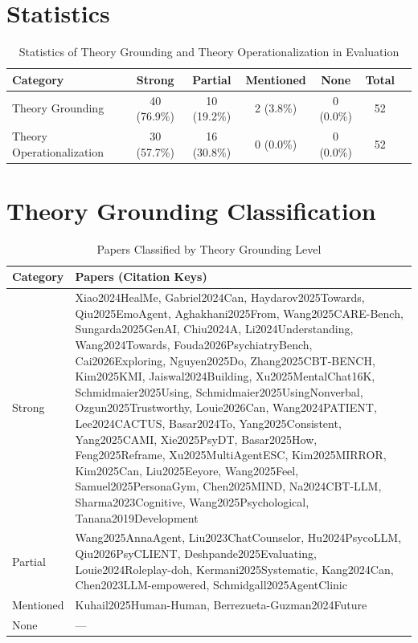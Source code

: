 
\section{Statistics}
\begin{table}[htbp]
\centering
\caption{Statistics of Theory Grounding and Theory Operationalization in Evaluation}
\label{tab:theory-stats}
\begin{tabular}{lcccccc}
\toprule
\textbf{Category} & \textbf{Strong} & \textbf{Partial} & \textbf{Mentioned} & \textbf{None} & \textbf{Total} \\
\midrule
Theory Grounding & 40 (76.9\%) & 10 (19.2\%) & 2 (3.8\%) & 0 (0.0\%) & 52 \\
Theory Operationalization & 30 (57.7\%) & 16 (30.8\%) & 0 (0.0\%) & 0 (0.0\%) & 52 \\
\bottomrule
\end{tabular}
\end{table}


\section{Theory Grounding Classification}
\begin{table}[htbp]
\centering
\caption{Papers Classified by Theory Grounding Level}
\label{tab:theory-grounding}
\small
\begin{tabular}{p{2.5cm}p{12.4cm}}
\toprule
\textbf{Category} & \textbf{Papers (Citation Keys)} \\
\midrule
Strong & Xiao2024HealMe, Gabriel2024Can, Haydarov2025Towards, Qiu2025EmoAgent, Aghakhani2025From, Wang2025CARE-Bench, Sungarda2025GenAI, Chiu2024A, Li2024Understanding, Wang2024Towards, Fouda2026PsychiatryBench, Cai2026Exploring, Nguyen2025Do, Zhang2025CBT-BENCH, Kim2025KMI, Jaiswal2024Building, Xu2025MentalChat16K, Schmidmaier2025Using, Schmidmaier2025UsingNonverbal, Ozgun2025Trustworthy, Louie2026Can, Wang2024PATIENT, Lee2024CACTUS, Basar2024To, Yang2025Consistent, Yang2025CAMI, Xie2025PsyDT, Basar2025How, Feng2025Reframe, Xu2025MultiAgentESC, Kim2025MIRROR, Kim2025Can, Liu2025Eeyore, Wang2025Feel, Samuel2025PersonaGym, Chen2025MIND, Na2024CBT-LLM, Sharma2023Cognitive, Wang2025Psychological, Tanana2019Development \\
Partial & Wang2025AnnaAgent, Liu2023ChatCounselor, Hu2024PsycoLLM, Qiu2026PsyCLIENT, Deshpande2025Evaluating, Louie2024Roleplay-doh, Kermani2025Systematic, Kang2024Can, Chen2023LLM-empowered, Schmidgall2025AgentClinic \\
Mentioned & Kuhail2025Human-Human, Berrezueta-Guzman2024Future \\
None & --- \\
\bottomrule
\end{tabular}
\end{table}


